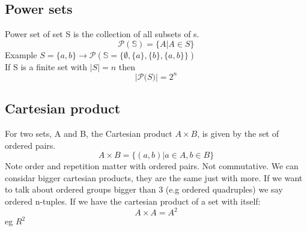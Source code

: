 \documentclass[a4paper, 11pt]{report}
\begin{document}
    \subsection{Power sets}
    Power set of set S is the collection of all subsets of s.
    \[\mathcal{P} (\mathbb{S}) = \{A | A \in S\}\]
    Example \(S = \{a, b\} \rightarrow \mathcal{P} (\mathbb{S} = \{\emptyset, \{a\},
    \{b\}, \{a, b\}\})\) \\
    If S is a finite set with \(|S| = n\) then \\
    \[|\mathcal{P} \mathbb(S)| = 2^{n}\]
    \subsection{Cartesian product}
    For two sets, A and B, the Cartesian product \(A \times B\), is given by the
    set of ordered pairs. \[A \times B = \{(a, b) | a \in A, b \in B\}\]
    Note order and repetition matter with ordered pairs. Not commutative. We can
    considar bigger cartesian products, they are the same just with more. If we
    want to talk about ordered groups bigger than 3 (e.g ordered quadruples) we
    say ordered n-tuples. If we have the cartesian product of a set with itself:
    \[A \times A = A^{2}\]
    eg \(R^{2}\)
\end{document}
